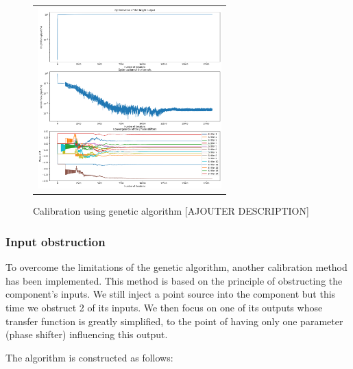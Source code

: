 \documentclass{aa}
\begin{document}
            \begin{figure}[H]
                \begin{center}
                \begin{tabular}{c}
                \includegraphics[height=7cm]{img/calibration_genetic.png}
                \end{tabular}
                \end{center}
                \caption[calibration_genetic] 
                { \label{fig:calibration_genetic} 
                Calibration using genetic algorithm [AJOUTER DESCRIPTION]}
            \end{figure}

        \subsubsection{Input obstruction}
            To overcome the limitations of the genetic algorithm, another calibration method has been implemented. This method is based on the principle of obstructing the component's inputs. We still inject a point source into the component but this time we obstruct 2 of its inputs. We then focus on one of its outputs whose transfer function is greatly simplified, to the point of having only one parameter (phase shifter) influencing this output.

            The algorithm is constructed as follows:
\end{document}
